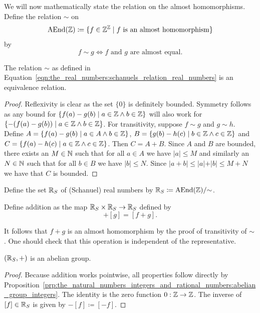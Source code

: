 \documentclass[../main.tex]{subfiles}
\begin{document}
We will now mathematically state the relation on the almost homomorphisms. Define the relation $\sim$ on
\begin{equation*}
    \operatorname{AEnd}(\mathbb{Z})\coloneq\{f\in\mathbb{Z}^{\mathbb{Z}}\mid f\text{ is an almost homomorphism}\}
\end{equation*}
by
\begin{equation}\label{eqn:the_real_numbers:schanuels_relation_real_numbers}
    f\sim g\iff f\text{ and }g\text{ are almost equal}.
\end{equation}
\begin{lemma}
    The relation $\sim$ as defined in Equation~\eqref{eqn:the_real_numbers:schanuels_relation_real_numbers} is an equivalence relation.
\end{lemma}
\begin{proof}
    Reflexivity is clear as the set $\{0\}$ is definitely bounded. Symmetry follows as any bound for $\{f(a)-g(b)\mid a\in\mathbb{Z}\land b\in\mathbb{Z}\}$ will also work for $\{-(f(a)-g(b))
    \mid a\in\mathbb{Z}\land b\in\mathbb{Z}\}$. For transitivity, suppose $f\sim g$ and $g\sim h$. Define $A=\{f(a)-g(b)\mid a\in A\land b\in\mathbb{Z}\}$, $B=\{g(b)-h(c)\mid b\in\mathbb{Z}\land c\in\mathbb{Z}\}$ and $C=\{f(a)-h(c)\mid a\in\mathbb{Z}\land c\in\mathbb{Z}\}$. Then $C=A+B$. Since $A$ and $B$ are bounded, there exists an $M\in\mathbb{N}$ such that for all $a\in A$ we have $\vert a\vert\leq M$ and similarly an $N\in\mathbb{N}$ such that for all $b\in B$ we have $\vert b\vert\leq N$. Since $\vert a+b\vert\leq\vert a\vert+\vert b\vert\leq M+N$ we have that $C$ is bounded.
\end{proof}

\begin{definition}
    Define the set $\mathbb{R}_S$ of (Schanuel) real numbers by $\mathbb{R}_S\coloneq\operatorname{AEnd}(\mathbb{Z})/{\sim}$.
\end{definition}

\begin{definition}
    Define addition as the map $\mathbb{R}_S\times\mathbb{R}_S\to\mathbb{R}_S$ defined by
    \begin{equation*}
        [f]+[g]=[f+g].
    \end{equation*}
\end{definition}
It follows that $f+g$ is an almost homomorphism by the proof of transitivity of $\sim$. One should check that this operation is independent of the representative.
\begin{proposition}\label{prp:the_real_numbers:schanuel_abelian_group_real_numbers}
    $(\mathbb{R}_S,+)$ is an abelian group.
\end{proposition}
\begin{proof}
    Because addition works pointwise, all properties follow directly by Proposition~\ref{prp:the_natural_numbers_integers_and_rational_numbers:abelian_group_integers}. The identity is the zero function $0:\mathbb{Z}\to\mathbb{Z}$. The inverse of $[f]\in\mathbb{R}_S$ is given by $-[f]\coloneq[-f]$.
\end{proof}
\end{document}
